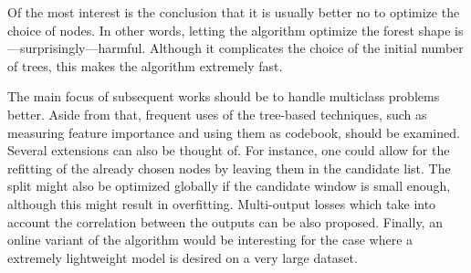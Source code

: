 \documentclass{article}
\begin{document}
Of the most interest is the conclusion that it is usually better no to optimize
the choice of nodes. In other words, letting the algorithm optimize the forest
shape is---surprisingly---harmful. Although it complicates the choice of the
initial number of trees, this makes the algorithm extremely fast.

The main focus of subsequent works should be to handle multiclass problems
better. Aside from that, frequent uses of the tree-based techniques, such as
measuring feature importance and using them as codebook, should be examined.
Several extensions can also be thought of. For instance, one could allow for the
refitting of the already chosen nodes by leaving them in the candidate list. The
split might also be optimized globally if the candidate window is small enough,
although this might result in overfitting. Multi-output losses which take into
account the correlation between the outputs can be also proposed.  Finally, an
online variant of the algorithm would be interesting for the case where a
extremely lightweight model is desired on a very large dataset.



\end{document}
